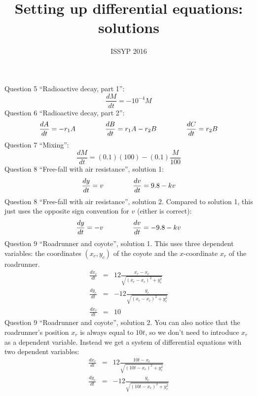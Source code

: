 \documentclass[aps,prd,superscriptaddress,groupedaddress,nofootinbib,nobibnotes]{revtex4}
\newcommand{\be}{\begin{equation}}
\newcommand{\ee}{\end{equation}}
\newcommand{\ba}{\begin{eqnarray}}
\newcommand{\ea}{\end{eqnarray}}
\newcommand{\nn}{\nonumber}
\begin{document}
\title{Setting up differential equations: solutions}
\author{ISSYP 2016}
\maketitle

\par\noindent
Question 5 ``Radioactive decay, part 1'':
\be
\frac{dM}{dt} = -10^{-4} M
\ee
Question 6 ``Radioactive decay, part 2'':
\be
\frac{dA}{dt} = -r_1 A
   \hspace{1.5cm}
\frac{dB}{dt} = r_1 A - r_2 B
   \hspace{1.5cm}
\frac{dC}{dt} = r_2 B
\ee
Question 7 ``Mixing'':
\be
\frac{dM}{dt} = (0.1) (100) - (0.1) \frac{M}{100}
\ee
Question 8 ``Free-fall with air resistance'', solution 1:
\be
\frac{dy}{dt} = v
   \hspace{1.5cm}
\frac{dv}{dt} = 9.8 - kv
\ee
Question 8 ``Free-fall with air resistance'', solution 2.  Compared to solution 1, this just uses the opposite sign convention for $v$ (either is correct):
\be
\frac{dy}{dt} = -v
   \hspace{1.5cm}
\frac{dv}{dt} = -9.8 - kv
\ee
Question 9 ``Roadrunner and coyote'', solution 1.  This uses three dependent variables: the coordinates $(x_c,y_c)$ of the coyote and the $x$-coordinate $x_r$ of the roadrunner.
\ba
\frac{dx_c}{dt} &=& 12 \frac{x_r-x_c}{\sqrt{(x_r-x_c)^2 + y_c^2}} \nn \\
\frac{dy_c}{dt} &=& -12 \frac{y_c}{\sqrt{(x_r-x_c)^2 + y_c^2}} \nn \\
\frac{dx_r}{dt} &=& 10
\ea
Question 9 ``Roadrunner and coyote'', solution 2.  You can also notice that the roadrunner's position $x_r$ is always equal to $10t$, so we don't need to introduce $x_r$ as
a dependent variable.  Instead we get a system of differential equations with two dependent variables:
\ba
\frac{dx_c}{dt} &=& 12 \frac{10t-x_c}{\sqrt{(10t-x_c)^2 + y_c^2}} \nn \\
\frac{dy_c}{dt} &=& -12 \frac{y_c}{\sqrt{(10t-x_c)^2 + y_c^2}}
\ea


%

% 
% 

\end{document}
